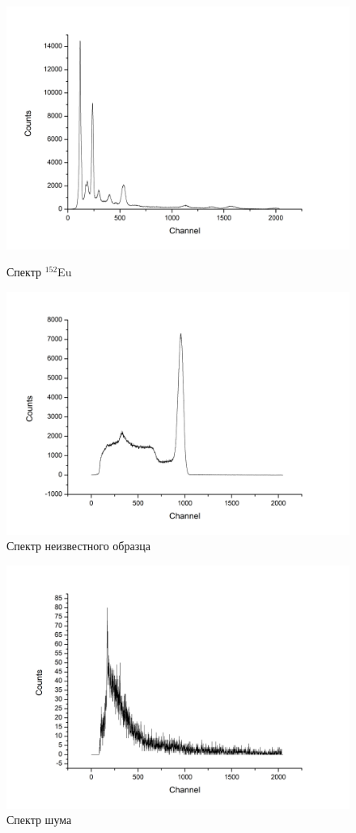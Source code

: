 \documentclass[a4paper]{article}
\begin{document}
\begin{figure}[ht]
\begin{center}
\begin{minipage}[h]{0.48\linewidth}
\includegraphics[width=1\linewidth]{image/Eu.png}
\caption{Спектр $^{152}$Eu} %
\end{minipage}
\hfill 
\begin{minipage}[ht]{0.48\linewidth}
\includegraphics[width=1\linewidth]{image/Unknown.png}
\caption{Спектр неизвестного образца}
\end{minipage}
\end{center}
\end{figure}

\begin{figure}[ht]
\begin{center}
\includegraphics[width=0.48\linewidth]{image/background.png}
\caption{Спектр шума}
\end{center}
\end{figure}
\end{document}
